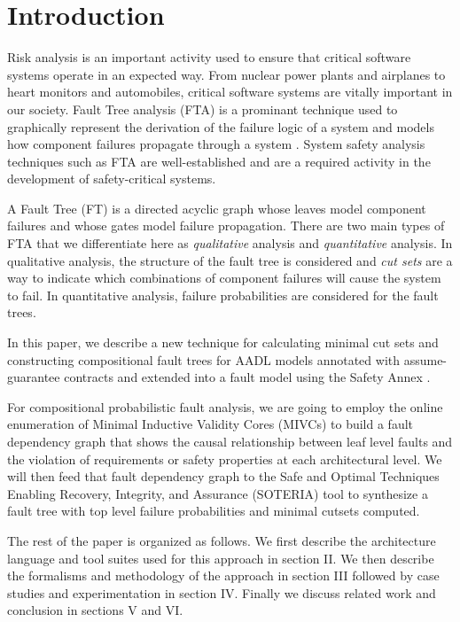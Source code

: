\section{Introduction}
\label{sec:intro}

Risk analysis is an important activity used to ensure that critical software systems operate in an expected way. From nuclear power plants and airplanes to heart monitors and automobiles, critical software systems are vitally important in our society. Fault Tree analysis (FTA) is a prominant technique used to graphically represent the derivation of the failure logic of a system and models how component failures propagate through a system \cite{0f356f05e72f43018211b36f97c8854a}. System safety analysis techniques such as FTA are well-established and are a required activity in the development of safety-critical systems. 

A Fault Tree (FT) is a directed acyclic graph whose leaves model component failures and whose gates model failure propagation.  There are two main types of FTA that we differentiate here as \textit{qualitative} analysis and \textit{quantitative} analysis. In qualitative analysis, the structure of the fault tree is considered and \textit{cut sets} are a way to indicate which combinations of component failures will cause the system to fail. In quantitative analysis, failure probabilities are considered for the fault trees.  

In this paper, we describe a new technique for calculating minimal cut sets and constructing compositional fault trees for AADL models \cite{AADL_Standard} annotated with assume-guarantee contracts \cite{QFCS15:backes} and extended into a fault model using the Safety Annex \cite{Stewart17:IMBSA,SATechReport}. 

For compositional probabilistic fault analysis, we are going to employ the online enumeration of Minimal Inductive Validity Cores (MIVCs) \cite{GhassabaniGW16,Ghassabani2017EfficientGO} to build a fault dependency graph that shows the causal relationship between leaf level faults and the violation of requirements or safety properties at each architectural level.  We will then feed that fault dependency graph to the Safe and Optimal Techniques Enabling Recovery, Integrity, and Assurance (SOTERIA) tool \cite{SOTERIAproject} to synthesize a fault tree with top level failure probabilities and minimal cutsets computed. 

The rest of the paper is organized as follows. We first describe the architecture language and tool suites used for this approach in section II. We then describe the formalisms and methodology of the approach in section III followed by case studies and experimentation in section IV. Finally we discuss related work and conclusion in sections V and VI.  
